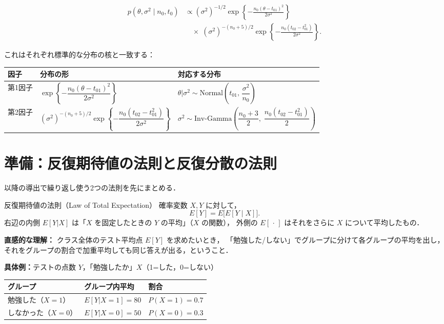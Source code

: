 \documentclass[lualatex,ja=standard,a4paper,12pt]{bxjsarticle}
\begin{document}
\begin{align*}
  p(\theta, \sigma^2 \mid n_0, t_0)
  &\propto
  (\sigma^2)^{-1/2}\exp\!\left\{-\frac{n_0(\theta - t_{01})^2}{2\sigma^2}\right\} \\
  &\quad \times\;
  (\sigma^2)^{-(n_0+5)/2}\exp\!\left\{-\frac{n_0(t_{02}-t_{01}^2)}{2\sigma^2}\right\}.
\end{align*}

\noindent
これはそれぞれ標準的な分布の核と一致する：

\medskip
\begin{center}
\renewcommand{\arraystretch}{1.6}
\begin{tabular}{lll}
\toprule
因子 & 分布の形 & 対応する分布 \\
\midrule
第1因子 & $\exp\!\left\{-\dfrac{n_0(\theta-t_{01})^2}{2\sigma^2}\right\}$ &
  $\theta|\sigma^2 \sim \mathrm{Normal}\!\left(t_{01},\, \dfrac{\sigma^2}{n_0}\right)$ \\[8pt]
第2因子 & $(\sigma^2)^{-(n_0+5)/2}\exp\!\left\{-\dfrac{n_0(t_{02}-t_{01}^2)}{2\sigma^2}\right\}$ &
  $\sigma^2 \sim \mathrm{Inv\text{-}Gamma}\!\left(\dfrac{n_0+3}{2},\; \dfrac{n_0(t_{02}-t_{01}^2)}{2}\right)$ \\
\bottomrule
\end{tabular}
\end{center}

\section{準備：反復期待値の法則と反復分散の法則}

以降の導出で繰り返し使う2つの法則を先にまとめる．

\begin{thmbox}{反復期待値の法則（Law of Total Expectation）}
確率変数 $X, Y$ に対して，
\[
  E[Y] = E\!\bigl[E[Y \mid X]\bigr].
\]
右辺の内側 $E[Y|X]$ は「$X$ を固定したときの $Y$ の平均」（$X$ の関数），
外側の $E[\,\cdot\,]$ はそれをさらに $X$ について平均したもの．
\end{thmbox}

\noindent\textbf{直感的な理解：}
クラス全体のテスト平均点 $E[Y]$ を求めたいとき，
「勉強した/しない」でグループに分けて各グループの平均を出し，
それをグループの割合で加重平均しても同じ答えが出る，ということ．

\medskip
\noindent\textbf{具体例：}テストの点数 $Y$，「勉強したか」$X$（1=した，0=しない）

\begin{center}
\renewcommand{\arraystretch}{1.3}
\begin{tabular}{lll}
\toprule
グループ & グループ内平均 & 割合 \\
\midrule
勉強した（$X=1$） & $E[Y|X=1] = 80$ & $P(X=1) = 0.7$ \\
しなかった（$X=0$） & $E[Y|X=0] = 50$ & $P(X=0) = 0.3$ \\
\bottomrule
\end{tabular}
\end{center}
\end{document}
